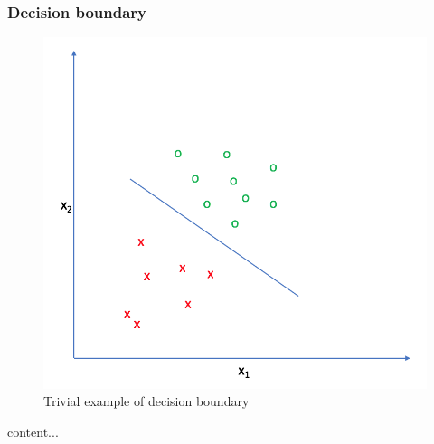 \documentclass{beamer}
\begin{document}
	\begin{frame}
		\frametitle{Decision boundary}
		\begin{figure}
			\centering
			\includegraphics[scale=0.5]{images/decision_boundary}
			\caption{Trivial example of decision boundary}
		\end{figure}
	\end{frame}

	\begin{frame}
		content...
	\end{frame}
\end{document}
